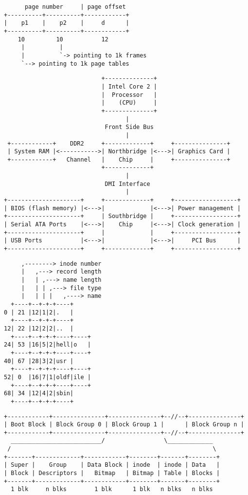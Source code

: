 \documentclass[varwidth,crop,multi={verbatim}]{standalone}
\begin{document}
\begin{verbatim}
      page number     | page offset
+----------+----------+------------+
|    p1    |    p2    |     d      |
+----------+----------+------------+
    10         10           12
     |          |
     |          `-> pointing to 1k frames
     `--> pointing to 1k page tables
\end{verbatim}

\begin{verbatim}
                            +--------------+
                            | Intel Core 2 |
                            |  Processor   |
                            |    (CPU)     |
                            +--------------+
                                   |
                             Front Side Bus
                                   |
 +------------+    DDR2     +-------------+     +---------------+
 | System RAM |<----------->| Northbridge |<--->| Graphics Card |
 +------------+   Channel   |    Chip     |     +---------------+
                            +-------------+
                                   |
                             DMI Interface
                                   |
+---------------------+     +-------------+     +------------------+
| BIOS (flash memory) |<--->|             |<--->| Power management |
+---------------------+     | Southbridge |     +------------------+
| Serial ATA Ports    |<--->|    Chip     |<--->| Clock generation |
+---------------------+     |             |     +------------------+
| USB Ports           |<--->|             |<--->|     PCI Bus      |
+---------------------+     +-------------+     +------------------+
\end{verbatim}

\begin{verbatim}
     ,--------> inode number
     |   ,---> record length
     |   | ,---> name length
     |   | | ,---> file type
     |   | | |   ,----> name
  +----+--+-+-+----+
0 | 21 |12|1|2|.   |
  +----+--+-+-+----+
12| 22 |12|2|2|..  |
  +----+--+-+-+----+----+
24| 53 |16|5|2|hell|o   |
  +----+--+-+-+----+----+
40| 67 |28|3|2|usr |
  +----+--+-+-+----+----+
52| 0  |16|7|1|oldf|ile |
  +----+--+-+-+----+----+
68| 34 |12|4|2|sbin|
  +----+--+-+-+----+
\end{verbatim}

\begin{verbatim}
+------------+---------------+---------------+--//--+---------------+
| Boot Block | Block Group 0 | Block Group 1 |      | Block Group n |
+------------+---------------+---------------+--//--+---------------+
  __________________________/                 \_____________
 /                                                          \
+-------+-------------+------------+--------+-------+--------+
| Super |    Group    | Data Block | inode  | inode | Data   |
| Block | Descriptors |   Bitmap   | Bitmap | Table | Blocks |
+-------+-------------+------------+--------+-------+--------+
  1 blk     n blks        1 blk      1 blk   n blks   n blks
\end{verbatim}
\end{document}
